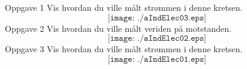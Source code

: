 \documentclass[12pt,a4paper]{article}
\begin{document}
\Huge
Oppgave 1
\normalsize
\vskip 0.5cm
Vis hvordan du ville målt strømmen i denne kretsen. 
$$\texttt{[image: ./aIndElec03.eps]}$$
\newpage
\Huge
Oppgave 2
\normalsize
\vskip 0.5cm
Vis hvordan du ville målt veriden på motstanden. 
$$\texttt{[image: ./aIndElec02.eps]}$$
\newpage
\Huge
Oppgave 3
\normalsize
\vskip 0.5cm
Vis hvordan du ville målt strømmen i denne kretsen. 
$$\texttt{[image: ./aIndElec01.eps]}$$
\vskip 1cm
\vskip 1cm
\end{document}
